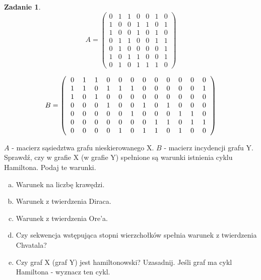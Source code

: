 \documentclass[11pt]{article}
\theoremstyle{definition}
\newtheorem{zadanie}{Zadanie}
\begin{document}
\begin{zadanie}
    $$ A = \left(
        \begin{matrix}
            0 & 1 & 1 & 0 & 0 & 1 & 0 \\
            1 & 0 & 0 & 1 & 1 & 0 & 1 \\
            1 & 0 & 0 & 1 & 0 & 1 & 0 \\
            0 & 1 & 1 & 0 & 0 & 1 & 1 \\
            0 & 1 & 0 & 0 & 0 & 0 & 1 \\
            1 & 0 & 1 & 1 & 0 & 0 & 1 \\
            0 & 1 & 0 & 1 & 1 & 1 & 0
        \end{matrix} \right) $$

    $$ B = \left(
        \begin{tabular}{cccccccccccc}
            0 & 1 & 1 & 0 & 0 & 0 & 0 & 0 & 0 & 0 & 0 & 0 \\
            1 & 1 & 0 & 1 & 1 & 1 & 0 & 0 & 0 & 0 & 0 & 1 \\
            1 & 0 & 1 & 0 & 0 & 0 & 0 & 0 & 0 & 0 & 0 & 0 \\
            0 & 0 & 0 & 1 & 0 & 0 & 1 & 0 & 1 & 0 & 0 & 0 \\
            0 & 0 & 0 & 0 & 0 & 1 & 0 & 0 & 0 & 1 & 1 & 0 \\
            0 & 0 & 0 & 0 & 0 & 0 & 0 & 1 & 1 & 0 & 1 & 1 \\
            0 & 0 & 0 & 0 & 1 & 0 & 1 & 1 & 0 & 1 & 0 & 0
        \end{tabular} \right)$$

    $A$ - macierz sąsiedztwa grafu nieskierowanego X.
    $B$ - macierz incydencji grafu Y.
    Sprawdź, czy w grafie X (w grafie Y) spełnione są warunki istnienia cyklu Hamiltona. Podaj te warunki.

    \begin{enumerate}[a)]
        \item Warunek na liczbę krawędzi.
        \item Warunek z twierdzenia Diraca.
        \item Warunek z twierdzenia Ore'a.
        \item Czy sekwencja wstępująca stopni wierzchołków spełnia warunek z twierdzenia Chvatala?
        \item Czy graf X (graf Y) jest hamiltonowski? Uzasadnij. Jeśli graf ma cykl Hamiltona - wyznacz ten cykl.
    \end{enumerate}
\end{zadanie}
\end{document}

